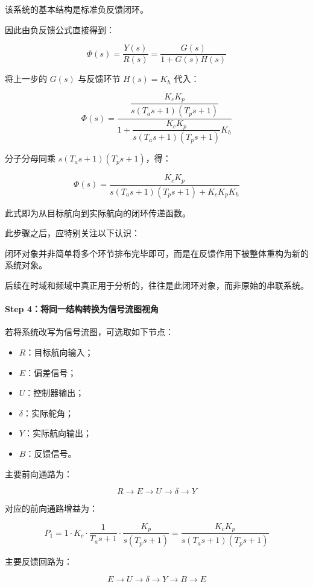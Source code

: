 \documentclass[
  11pt]{article}
\providecommand{\tightlist}{%
  \setlength{\itemsep}{0pt}\setlength{\parskip}{0pt}}
\renewenvironment{quote}
  {\begin{HandoutQuoteBox}\small\color{TitleBlue}\noindent\ignorespaces}
  {\end{HandoutQuoteBox}}
\begin{document}
该系统的基本结构是标准负反馈闭环。

因此由负反馈公式直接得到：

\[
\Phi(s)=\frac{Y(s)}{R(s)}=\frac{G(s)}{1+G(s)H(s)}
\]

将上一步的 \(G(s)\) 与反馈环节 \(H(s)=K_h\) 代入：

\[
\Phi(s)=\frac{\dfrac{K_cK_p}{s(T_a s+1)(T_p s+1)}}{1+\dfrac{K_cK_p}{s(T_a s+1)(T_p s+1)}K_h}
\]

分子分母同乘 \(s(T_a s+1)(T_p s+1)\)，得：

\[
\Phi(s)=\frac{K_cK_p}{s(T_a s+1)(T_p s+1)+K_cK_pK_h}
\]

此式即为从目标航向到实际航向的闭环传递函数。

此步骤之后，应特别关注以下认识：

\begin{quote}
闭环对象并非简单将多个环节排布完毕即可，而是在反馈作用下被整体重构为新的系统对象。
\end{quote}

后续在时域和频域中真正用于分析的，往往是此闭环对象，而非原始的串联系统。

\paragraph{Step
4：将同一结构转换为信号流图视角}\label{step-4ux5c06ux540cux4e00ux7ed3ux6784ux8f6cux6362ux4e3aux4fe1ux53f7ux6d41ux56feux89c6ux89d2}

若将系统改写为信号流图，可选取如下节点：

\begin{itemize}
\tightlist
\item
  \(R\)：目标航向输入；
\item
  \(E\)：偏差信号；
\item
  \(U\)：控制器输出；
\item
  \(\delta\)：实际舵角；
\item
  \(Y\)：实际航向输出；
\item
  \(B\)：反馈信号。
\end{itemize}

主要前向通路为：

\[
R \to E \to U \to \delta \to Y
\]

对应的前向通路增益为：

\[
P_1=1\cdot K_c\cdot \frac{1}{T_a s+1}\cdot \frac{K_p}{s(T_p s+1)}
=\frac{K_cK_p}{s(T_a s+1)(T_p s+1)}
\]

主要反馈回路为：

\[
E \to U \to \delta \to Y \to B \to E
\]
\end{document}
